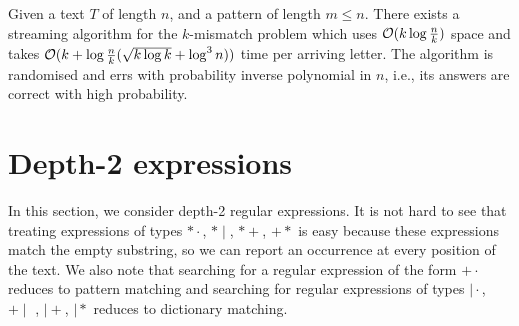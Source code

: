 \documentclass{article}
\begin{document}
\begin{theorem}
\label{th:streaming-k-mismatch}
Given a text $T$ of length $n$, and a pattern of length $m \leq n$. 
There  exists  a  streaming algorithm for the $k$-mismatch problem which  uses $\mathcal{O}(k\log\frac{n}{k})$ space  and takes $ \mathcal{O}(k + \log\frac{n}{k} (\sqrt{k\log k}+\log^3 n))$ time per arriving letter.  The  algorithm  is  randomised  and  errs  with  probability inverse polynomial in $n$, i.e., its answers are correct with high probability.
\end{theorem}

\section{Depth-2 expressions}
In this section, we consider depth-2 regular expressions. It is not hard to see that treating expressions of types $*\cdot$, $*\mid$, $*+$, $+*$ is easy because these expressions match the empty substring, so we can report an occurrence at every position of the text. We also note that searching for a regular expression of the form $+\cdot$ reduces to pattern matching and searching for regular expressions of types $\mid \cdot$, $+ \mid$ , $\mid +$, $\mid *$ reduces to dictionary matching.

\end{document}
